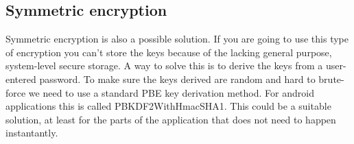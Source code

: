 \subsection{Symmetric encryption}
Symmetric encryption is also a possible solution. If you are going to use this type of encryption you can’t store the keys because of the lacking general purpose, system-level secure storage. A way to solve this is to derive the keys from a user-entered password. To make sure the keys derived are random and hard to brute-force we need to use a standard PBE key derivation method. For android applications this is called PBKDF2WithHmacSHA1.
\newline
\newline
This could be a suitable solution, at least for the parts of the application that does not need to happen instantantly. 